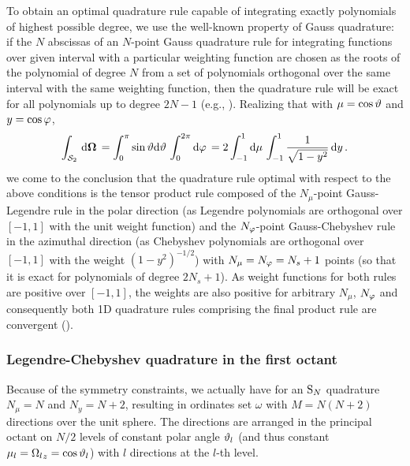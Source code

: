 To obtain an optimal quadrature rule capable of integrating exactly polynomials of highest possible degree, we use the 
well-known property of Gauss quadrature: if the $N$ abscissas of an $N$-point Gauss quadrature rule for integrating
functions over given interval with a particular weighting function are chosen as the roots of the polynomial
of degree $N$ from a set of polynomials orthogonal over the same interval with the same weighting function,
then the quadrature rule will be exact for all polynomials up to degree $2N-1$ (e.g., \cite[Chap. 4]{Ralston}).
Realizing that with $\mu = \cos \vartheta$ and $y = \cos \varphi$,
$$
	\int_{\mathcal{S}_2}\,\text{d}\mathbf{\Omega}\, = \int_0^\pi\sin \vartheta\text{d}\vartheta\,\int_0^{2\pi}\text{d}\varphi\,
	 = 2\int_{-1}^{1}\text{d}\mu\,\int_{-1}^{1}\frac{1}{\sqrt{1-y^2}}\,\text{d}y\,. 
$$
we come to the conclusion that the quadrature rule optimal with respect to the above conditions is the tensor product
rule composed of the $N_\mu$-point Gauss-Legendre rule in the polar direction (as Legendre polynomials are orthogonal over
$[-1,1]$ with the unit weight function) and the $N_\varphi$-point Gauss-Chebyshev rule in the azimuthal direction (as
Chebyshev polynomials are orthogonal over $[-1,1]$ with the weight $(1-y^2)^{-1/2}$) with $N_\mu = N_\varphi
= N_s + 1$ points (so that it is exact for polynomials of degree $2 N_s + 1$). As weight functions for both rules are positive over $[-1,1]$, the
weights are also positive for arbitrary $N_\mu$, $N_\varphi$ and consequently both 1D quadrature rules comprising the
final product rule are convergent (\cite[Chap. 4]{Ralston}).

\subsubsection{Legendre-Chebyshev quadrature in the first octant}
Because of the symmetry constraints, we actually have for an $\text{S}_{N}$
quadrature $N_\mu = N$ and $N_y = N + 2$, resulting in ordinates set $\omega$ with $M = N(N+2)$ directions over the unit
sphere. The directions are arranged in the principal octant on $N/2$ levels of constant polar angle $\vartheta_l$ (and thus
constant $\mu_l = {\Omega_l}_z = \cos \vartheta_l$) with $l$ directions at the $l$-th level. 

